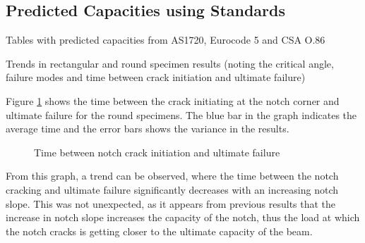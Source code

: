 \documentclass[11pt,a4paper]{article}
\numberwithin{equation}{subsection}
\begin{document}
\subsection{Predicted Capacities using Standards}

\vspace*{\baselineskip}
\noindent Tables with predicted capacities from AS1720, Eurocode 5 and CSA O.86\par


\vspace*{\baselineskip}
\noindent Trends in rectangular and round specimen results (noting the critical angle, failure modes and time between crack initiation and ultimate failure) \par

\vspace*{\baselineskip}

\noindent
Figure \ref{fig:Round-Crack-fail} shows the time between the crack initiating at the notch corner and ultimate failure for the round specimens. The blue bar in the graph indicates the average time and the error bars shows the variance in the results. 

	\begin{figure}[h]
		\begin{center}
		\end{center}
		\caption{Time between notch crack initiation and ultimate failure}
		\label{fig:Round-Crack-fail}
	\end{figure}

From this graph, a trend can be observed, where the time between the notch cracking and ultimate failure significantly decreases with an increasing notch slope. This was not unexpected, as it appears from previous results that the increase in notch slope increases the capacity of the notch, thus the load at which the notch cracks is getting closer to the ultimate capacity of the beam. 
\end{document}
